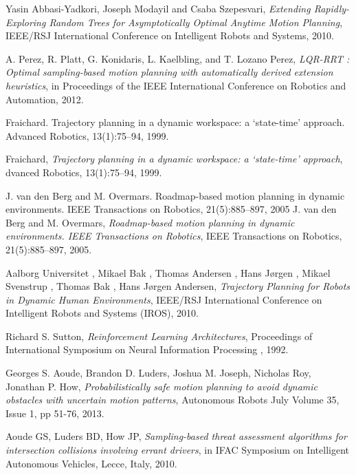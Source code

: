 \documentclass[MTech]{iitmdiss}
\begin{document}
\begin{thebibliography}{99}
	Yasin Abbasi-Yadkori, Joseph Modayil and Csaba Szepesvari,
  \emph{Extending Rapidly-Exploring Random Trees for Asymptotically Optimal Anytime Motion Planning},
	IEEE/RSJ International Conference on Intelligent Robots and Systems,
	2010.	

	A. Perez, R. Platt, G. Konidaris, L. Kaelbling, and T. Lozano Perez,
  \emph{LQR-RRT : Optimal sampling-based motion planning with automatically derived extension heuristics},
	in Proceedings of the IEEE International Conference on Robotics and Automation,
	2012.	
	
	
	
	
	
Fraichard. Trajectory planning in a dynamic workspace: a ‘state-time’ approach. Advanced Robotics, 13(1):75–94, 1999.

	Fraichard,
  \emph{Trajectory planning in a dynamic workspace: a ‘state-time’ approach},
	dvanced Robotics, 13(1):75–94, 
	1999.
	
J. van den Berg and M. Overmars. Roadmap-based motion planning in dynamic environments. IEEE Transactions on Robotics, 21(5):885–897, 2005 
	J. van den Berg and M. Overmars,
  \emph{Roadmap-based motion planning in dynamic environments. IEEE Transactions on Robotics},
	 IEEE Transactions on Robotics, 21(5):885–897, 
	 2005.
	 
	 
	Aalborg Universitet , Mikael Bak , Thomas Andersen , Hans Jørgen , Mikael Svenstrup , Thomas Bak , Hans Jørgen Andersen,
  \emph{Trajectory Planning for Robots in Dynamic Human Environments},
	IEEE/RSJ International Conference on Intelligent Robots and Systems (IROS), 
	2010.
	
	Richard S. Sutton,
  \emph{Reinforcement Learning Architectures},
	Proceedings of International Symposium on Neural Information Processing , 
	1992.
	
	Georges S. Aoude, Brandon D. Luders, Joshua M. Joseph, Nicholas Roy, Jonathan P. How,
  \emph{Probabilistically safe motion planning to avoid dynamic obstacles with uncertain motion patterns},
	Autonomous Robots
	July Volume 35, Issue 1, pp 51-76,
	2013.	
	

	Aoude GS, Luders BD, How JP,
  \emph{Sampling-based threat assessment algorithms for intersection collisions involving errant drivers},
	in IFAC Symposium on Intelligent Autonomous Vehicles, Lecce, Italy,
	2010.	
	

\end{thebibliography}
\end{document}
